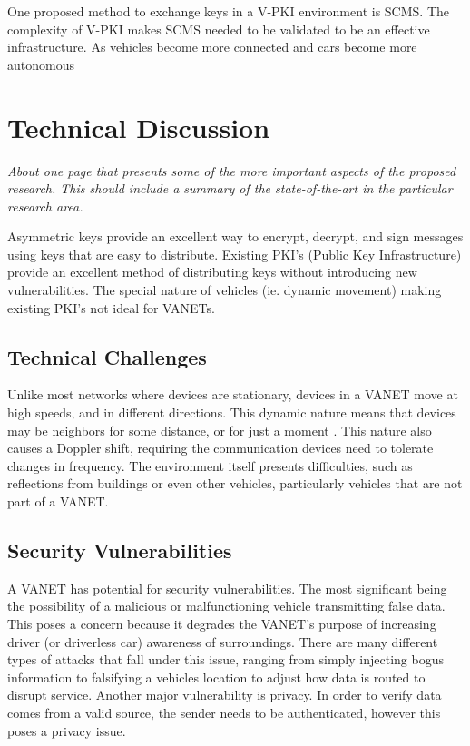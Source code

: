 \documentclass [11pt]{article}
\newcommand{\sechint}[1]{\small{\emph{#1}} \bigskip}
\begin{document}
One proposed method to exchange keys in a V-PKI environment is SCMS. The complexity of V-PKI makes SCMS needed to be validated to be an effective infrastructure.
As vehicles become more connected and cars become more autonomous

\section{Technical Discussion}{\sechint{About one page that presents some of the more important aspects of the proposed research. This should include a summary of the state-of-the-art in the particular research area.}}

Asymmetric keys provide an excellent way to encrypt, decrypt, and sign messages using keys that are easy to distribute. Existing PKI's (Public Key Infrastructure) provide an excellent method of distributing keys without introducing new vulnerabilities. The special nature of vehicles (ie. dynamic movement) making existing PKI's not ideal for VANETs.

\subsection{Technical Challenges}
Unlike most networks where devices are stationary, devices in a VANET move at high speeds, and in different directions. This dynamic nature means that devices may be neighbors for some distance, or for just a moment \autocite{CommPatterns}. This nature also causes a Doppler shift, requiring the communication devices need to tolerate changes in frequency. The environment itself presents difficulties, such as reflections from buildings or even other vehicles, particularly vehicles that are not part of a VANET.

\subsection{Security Vulnerabilities}
A VANET has potential for security vulnerabilities. The most significant being the possibility of a malicious or malfunctioning vehicle transmitting false data. This poses a concern because it degrades the VANET's purpose of increasing driver (or driverless car) awareness of surroundings. There are many different types of attacks that fall under this issue, ranging from simply injecting bogus information to falsifying a vehicles location to adjust how data is routed to disrupt service. Another major vulnerability is privacy. In order to verify data comes from a valid source, the sender needs to be authenticated, however this poses a privacy issue.
\end{document}
